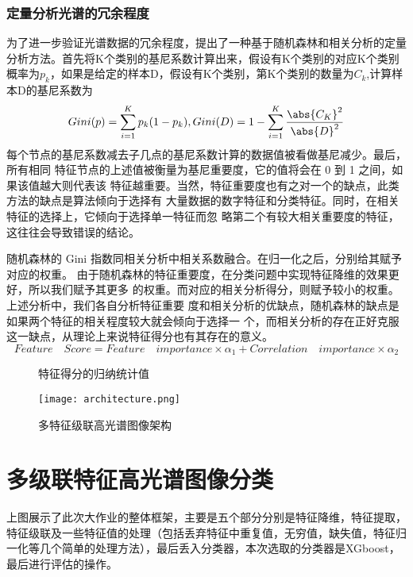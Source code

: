 \documentclass[runningheads]{llncs}
\begin{document}
\subsubsection{定量分析光谱的冗余程度}
为了进一步验证光谱数据的冗余程度，提出了一种基于随机森林和相关分析的定量分析方法。首先将K个类别的基尼系数计算出来，假设有K个类别的对应K个类别概率为$p_k$，如果是给定的样本D，假设有K个类别，第K个类别的数量为$C_k$,计算样本D的基尼系数为
\begin{equation}
    Gini(p) = \sum_{i=1}^Kp_k(1-p_k),Gini(D)=1-\sum_{i=1}^K\frac{\abs{C_K}^2}{\abs{D}^2}
\end{equation}
每个节点的基尼系数减去子几点的基尼系数计算的数据值被看做基尼减少。最后，所有相同
特征节点的上述值被衡量为基尼重要度，它的值将会在 0 到 1 之间，如果该值越大则代表该
特征越重要。当然，特征重要度也有之对一个的缺点，此类方法的缺点是算法倾向于选择有
大量数据的数字特征和分类特征。同时，在相关特征的选择上，它倾向于选择单一特征而忽
略第二个有较大相关重要度的特征，这往往会导致错误的结论。

随机森林的 Gini 指数同相关分析中相关系数融合。在归一化之后，分别给其赋予对应的权重。
由于随机森林的特征重要度，在分类问题中实现特征降维的效果更好，所以我们赋予其更多
的权重。而对应的相关分析得分，则赋予较小的权重。上述分析中，我们各自分析特征重要
度和相关分析的优缺点，随机森林的缺点是如果两个特征的相关程度较大就会倾向于选择一
个，而相关分析的存在正好克服这一缺点，从理论上来说特征得分也有其存在的意义。
\begin{equation}
    Feature\quad Score = Feature\quad importance \times \alpha_1 + Correlation\quad importance \times \alpha_2
\end{equation}
\begin{figure}[t]
\centering  %
\caption{特征得分的归纳统计值}
\label{1}
\end{figure}
\begin{figure}
    \centering
    \texttt{[image: architecture.png]}
    \caption{多特征级联高光谱图像架构}
    \label{fig:my_label}
\end{figure}
\section{多级联特征高光谱图像分类}
    上图展示了此次大作业的整体框架，主要是五个部分分别是特征降维，特征提取，特征级联及一些特征值的处理（包括丢弃特征中重复值，无穷值，缺失值，特征归一化等几个简单的处理方法），最后丢入分类器，本次选取的分类器是XGboost，最后进行评估的操作。
    
\end{document}
